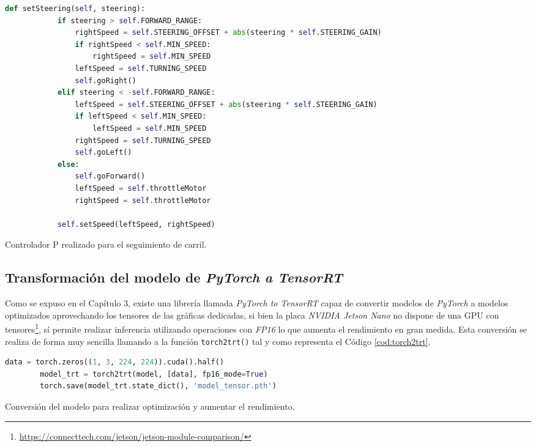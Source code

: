 \begin{code}[h]
	\begin{lstlisting}[language=Python]
		def setSteering(self, steering):
			if steering > self.FORWARD_RANGE:
				rightSpeed = self.STEERING_OFFSET + abs(steering * self.STEERING_GAIN)
				if rightSpeed < self.MIN_SPEED:
					rightSpeed = self.MIN_SPEED
				leftSpeed = self.TURNING_SPEED
				self.goRight()
			elif steering < -self.FORWARD_RANGE:
				leftSpeed = self.STEERING_OFFSET + abs(steering * self.STEERING_GAIN)
				if leftSpeed < self.MIN_SPEED:
					leftSpeed = self.MIN_SPEED
				rightSpeed = self.TURNING_SPEED
				self.goLeft()
			else:
				self.goForward()
				leftSpeed = self.throttleMotor
				rightSpeed = self.throttleMotor
			
			self.setSpeed(leftSpeed, rightSpeed)
	\end{lstlisting}
	\caption[Controlador P realizado para el seguimiento de carril.]{Controlador P realizado para el seguimiento de carril.}
	\label{cod:controller}
\end{code}

\subsection{Transformación del modelo de \textit{PyTorch a TensorRT}}
Como se expuso en el Capítulo 3, existe una librería llamada \textit{PyTorch to TensorRT} capaz de convertir modelos de \textit{PyTorch} a modelos optimizados aprovechando los tensores de las gráficas dedicadas, si bien la placa \textit{NVIDIA Jetson Nano} no dispone de una GPU con tensores\footnote{\url{https://connecttech.com/jetson/jetson-module-comparison/}}, sí permite realizar inferencia utilizando operaciones con \textit{FP16} lo que aumenta el rendimiento en gran medida. Esta conversión se realiza de forma muy sencilla llamando a la función \verb|torch2trt()| tal y como representa el Código \ref{cod:torch2trt}.\\

\begin{code}[h]
	\begin{lstlisting}[language=Python]
		data = torch.zeros((1, 3, 224, 224)).cuda().half()
		model_trt = torch2trt(model, [data], fp16_mode=True)
		torch.save(model_trt.state_dict(), 'model_tensor.pth')
	\end{lstlisting}
	\caption[Conversión del modelo para realizar optimización y aumentar el rendimiento.]{Conversión del modelo para realizar optimización y aumentar el rendimiento.}
	\label{cod:torch2trt}
\end{code}

